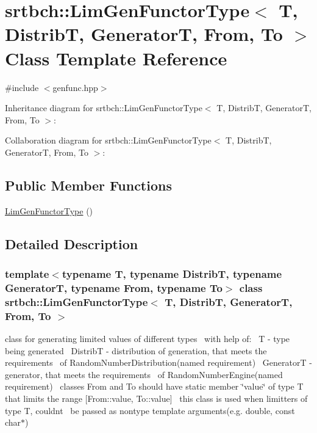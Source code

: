 \hypertarget{classsrtbch_1_1LimGenFunctorType}{}\section{srtbch\+:\+:Lim\+Gen\+Functor\+Type$<$ T, DistribT, GeneratorT, From, To $>$ Class Template Reference}
\label{classsrtbch_1_1LimGenFunctorType}


{\ttfamily \#include $<$genfunc.\+hpp$>$}



Inheritance diagram for srtbch\+:\+:Lim\+Gen\+Functor\+Type$<$ T, DistribT, GeneratorT, From, To $>$\+:


Collaboration diagram for srtbch\+:\+:Lim\+Gen\+Functor\+Type$<$ T, DistribT, GeneratorT, From, To $>$\+:
\subsection*{Public Member Functions}
\begin{DoxyCompactItemize}
\item 
\hyperlink{classsrtbch_1_1LimGenFunctorType_ab4a7249afd2cc44b0629061067316157}{Lim\+Gen\+Functor\+Type} ()
\end{DoxyCompactItemize}


\subsection{Detailed Description}
\subsubsection*{template$<$typename T, typename DistribT, typename GeneratorT, typename From, typename To$>$\newline
class srtbch\+::\+Lim\+Gen\+Functor\+Type$<$ T, Distrib\+T, Generator\+T, From, To $>$}

class for generating limited values of different types~\newline
with help of\+:~\newline
T -\/ type being generated~\newline
DistribT -\/ distribution of generation, that meets the requirements~\newline
of Random\+Number\+Distribution(named requirement)~\newline
GeneratorT -\/ generator, that meets the requirements~\newline
of Random\+Number\+Engine(named requirement)~\newline
classes From and To should have static member \char`\"{}value\char`\"{} of type T~\newline
that limits the range \mbox{[}From\+::value, To\+::value\mbox{]}~\newline
this class is used when limitters of type T, couldn\textquotesingle{}t~\newline
be passed as nontype template arguments(e.\+g. double, const char$\ast$) 

